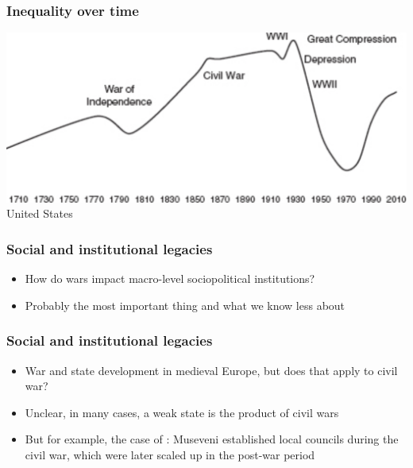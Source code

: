 \documentclass[aspectratio=43]{beamer}
\begin{document}
\begin{frame}
\frametitle{Inequality over time}
\centering

\includegraphics[width = \textwidth]{img/ineq-us}\\\vspace{15pt}United States

\end{frame}

\begin{frame}
\frametitle{Social and institutional legacies}
\centering

\begin{itemize}
  \item How do wars impact macro-level sociopolitical institutions?
  \item Probably the most important thing and what we know less about
\end{itemize}

\end{frame}

\begin{frame}
\frametitle{Social and institutional legacies}
\centering

\begin{itemize}[<+->]
  \item War and state development in medieval Europe, but does that apply to civil war?
  \item Unclear, in many cases, a weak state is the product of civil wars
  \item But for example, the case of {\color{red}{Uganda}}: Museveni established local councils during the civil war, which were later scaled up in the post-war period
\end{itemize}

\end{frame}
\end{document}
